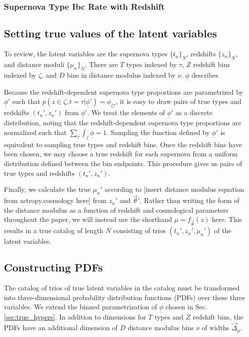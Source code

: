 \documentclass[12pt, onecolumn]{emulateapj}
\newcommand{\textul}{\underline}
\begin{document}
\subsubsection{Supernova Type Ibc Rate with Redshift}
\label{sec:TypeIbcRate}
 
\subsection{Setting true values of the latent variables}
\label{sec:true_latents}

To review, the latent variables are the supernova types $\{t_{n}\}_{N}$, redshifts $\{z_{n}\}_{N}$, and distance moduli $\{\mu_{n}\}_{N}$.  There are $T$ types indexed by $\tau$, $Z$ redshift bins indexed by $\zeta$, and $D$ bins in distance modulus indexed by $\nu$.  $\textul{\phi}$ describes 

Because the redshift-dependent supernova type proportions are parametrized by $\textul{\phi}'$ such that $p(z\in\zeta, t=\tau | \textul{\phi}') = \phi_{\zeta\tau}$, it is easy to draw pairs of true types and redshifts $(t_{n}', z_{n}')$ from $\textul{\phi}'$.  We treat the elements of $\textul{\phi}'$ as a discrete distribution, noting that the redshift-dependent supernova type proportions are normalized such that $\sum_{\tau}\int_{\zeta}\textul{\phi}=1$.  Sampling the function defined by $\textul{\phi}'$ is equivalent to sampling true types and redshift bins.  Once the redshift bins have been chosen, we may choose a true redshift for each supernova from a uniform distribution defined between the bin endpoints.  This procedure gives us pairs of true types and redshifts $(t_{n}', z_{n}')$.

Finally, we calculate the true $\mu_{n}'$ according to [insert distance modulus equation from astropy.cosmology here] from $z_{n}'$ and $\vec{\theta}'$.  Rather than writing the form of the distance modulus as a function of redshift and cosmological parameters throughout the paper, we will instead use the shorthand $\mu = f_{\vec{\theta}}(z)$ here.  This results in a true catalog of length $N$ consisting of trios $(t_{n}', z_{n}', \mu_{n}')$ of the latent variables.

\subsection{Constructing PDFs}
\label{sec:pdfs}

The catalog of trios of true latent variables in the catalog must be transformed into three-dimensional probability distribution functions (PDFs) over these three variables.  We extend the binned parametrization of $\textul{\phi}$ chosen in Sec. \ref{sec:true_hypers}.  In addition to dimensions for $T$ types and $Z$ redshift bins, the PDFs have an additional dimension of $D$ distance modulus bins $\nu$ of widths $\vec{\Delta}_{\mu}$.  
\end{document}
